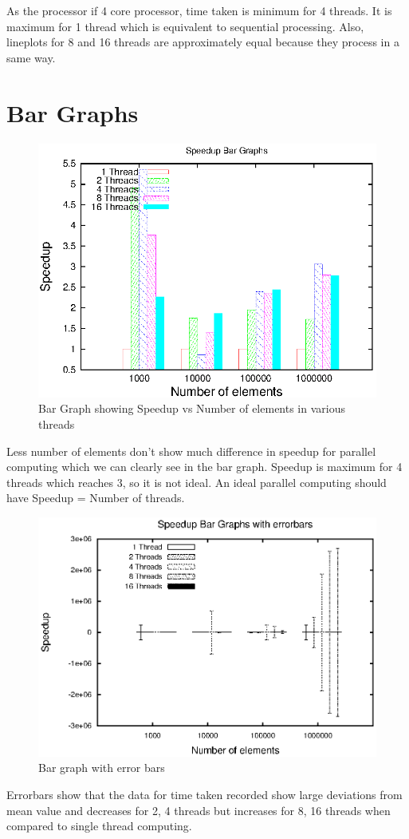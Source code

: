 \documentclass[a4paper, 12pt]{report}
\begin{document}
\vskip 0.5in
{\Large As the processor if 4 core processor, time taken is minimum for 4 threads. It is maximum for 1 thread which is equivalent to sequential processing. Also, lineplots for 8 and 16 threads are approximately equal because they process in a same way.}

\chapter{Bar Graphs}

\begin{figure}[H]
\centering
\includegraphics[width=1\textwidth]{speedup.eps}
 \caption{Bar Graph showing Speedup vs Number of elements in various threads}
\end{figure}

\vskip 0.5in
{\Large Less number of elements don't show much difference in speedup for parallel computing which we can clearly see in the bar graph. Speedup is maximum for 4 threads which reaches 3, so it is not ideal. An ideal parallel computing should have Speedup = Number of threads.}

\begin{figure}[H]
\centering
\includegraphics[width=1\textwidth]{speedup_errorbar.eps}
 \caption{Bar graph with error bars}
\end{figure}

\vskip 0.5in
\noindent
{\Large Errorbars show that the data for time taken recorded show large deviations from mean value and decreases for 2, 4 threads but increases for 8, 16 threads when compared to single thread computing.}
\end{document}
